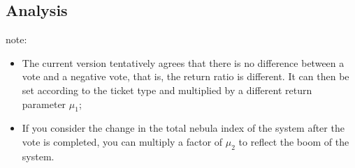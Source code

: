 \subsection{Analysis}

note:
\begin{itemize}
\item The current version tentatively agrees that there is no difference between a vote and a negative vote, that is, the return ratio is different. It can then be set according to the ticket type and multiplied by a different return parameter $\mu_1$;
\item If you consider the change in the total nebula index of the system after the vote is completed, you can multiply a factor of $\mu_2$ to reflect the boom of the system.
\end{itemize}


